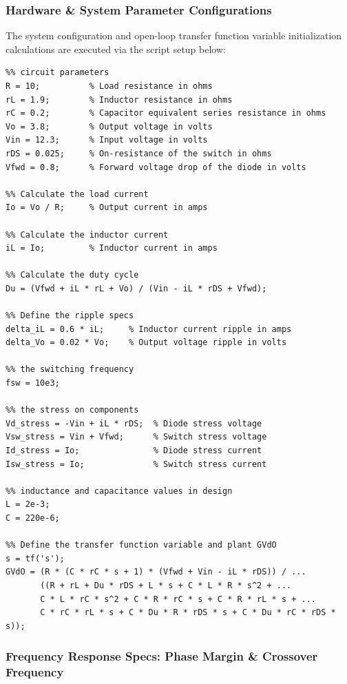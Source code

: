 \newpage

\subsubsection{Hardware \& System Parameter Configurations}
The system configuration and open-loop transfer function variable initialization calculations are executed via the script setup below:

\begin{lstlisting}
%% circuit parameters
R = 10;          % Load resistance in ohms
rL = 1.9;        % Inductor resistance in ohms
rC = 0.2;        % Capacitor equivalent series resistance in ohms
Vo = 3.8;        % Output voltage in volts
Vin = 12.3;      % Input voltage in volts
rDS = 0.025;     % On-resistance of the switch in ohms
Vfwd = 0.8;      % Forward voltage drop of the diode in volts

%% Calculate the load current
Io = Vo / R;     % Output current in amps

%% Calculate the inductor current
iL = Io;         % Inductor current in amps

%% Calculate the duty cycle
Du = (Vfwd + iL * rL + Vo) / (Vin - iL * rDS + Vfwd);

%% Define the ripple specs
delta_iL = 0.6 * iL;     % Inductor current ripple in amps
delta_Vo = 0.02 * Vo;    % Output voltage ripple in volts

%% the switching frequency
fsw = 10e3;

%% the stress on components
Vd_stress = -Vin + iL * rDS;  % Diode stress voltage
Vsw_stress = Vin + Vfwd;      % Switch stress voltage
Id_stress = Io;               % Diode stress current
Isw_stress = Io;              % Switch stress current

%% inductance and capacitance values in design
L = 2e-3;
C = 220e-6;

%% Define the transfer function variable and plant GVdO
s = tf('s');
GVdO = (R * (C * rC * s + 1) * (Vfwd + Vin - iL * rDS)) / ...
       ((R + rL + Du * rDS + L * s + C * L * R * s^2 + ...
       C * L * rC * s^2 + C * R * rC * s + C * R * rL * s + ...
       C * rC * rL * s + C * Du * R * rDS * s + C * Du * rC * rDS * s));
\end{lstlisting}

\subsubsection{Frequency Response Specs: Phase Margin \& Crossover Frequency}

